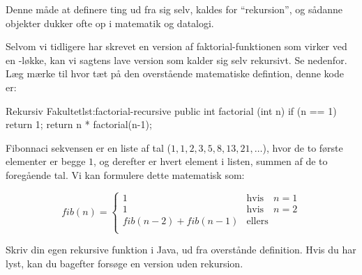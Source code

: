         Denne måde at definere ting ud fra sig selv, kaldes for
        ``rekursion'', og sådanne objekter dukker ofte op i matematik
        og datalogi.


        Selvom vi tidligere har skrevet en version af
        faktorial-funktionen som virker ved en -løkke,
        kan vi sagtens lave version som kalder sig selv rekursivt. Se
        nedenfor. Læg mærke til hvor tæt på den overstående
        matematiske defintion, denne kode er:

        \begin{JavaCode}{Rekursiv Fakultet}{lst:factorial-recursive}
            public int factorial (int n) {
                if (n == 1)   return 1;
                return n * factorial(n-1);
            }
        \end{JavaCode}

        \begin{exercise}
            Fibonnaci sekvensen er en liste af tal (\(1, 1, 2, 3, 5,
            8, 13, 21, \dots\)), hvor de to første elementer er
            begge \(1\), og derefter er hvert element i listen,
            summen af de to foregående tal. Vi kan formulere dette
            matematisk som:

            \begin{equation}
                fib(n) = \begin{cases}
                             1                   & \text{hvis} \quad n = 1 \\
                             1                   & \text{hvis} \quad n = 2 \\
                             fib(n-2)+fib(n-1)   & \text{ellers} \\
                      \end{cases}
            \end{equation}

            Skriv din egen rekursive  funktion i Java,
            ud fra overstånde definition. Hvis du har lyst, kan du
            bagefter forsøge en version uden rekursion.
        \end{exercise}


